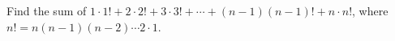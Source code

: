 Find the sum of $1\cdot 1!+2\cdot 2!+3\cdot 3!+\cdots+(n-1)(n-1)!+n\cdot n!$,  where $n!=n(n-1)(n-2)\cdots2\cdot1$.